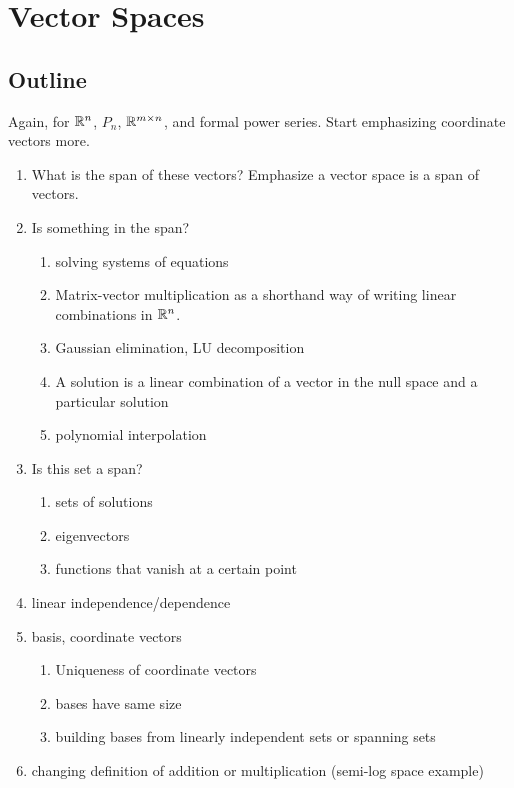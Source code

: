 \chapter{Vector Spaces}
\section{Outline}
Again, for $\mathbb{R}^n$, $P_n$, $\mathbb{R}^{m\times n}$, and formal power
series. Start emphasizing coordinate vectors more.
\begin{enumerate}
\item What is the span of these vectors?  Emphasize a vector space is
  a span of vectors.

\item Is something in the span?
  \begin{enumerate}
  \item solving systems of equations
  \item Matrix-vector multiplication as a shorthand way of writing
    linear combinations in $\mathbb{R}^n$.
  \item Gaussian elimination, LU decomposition
  \item A solution is a linear combination of a vector in the null
    space and a particular solution
  \item polynomial interpolation
  \end{enumerate}

\item Is this set a span?
  \begin{enumerate}
  \item sets of solutions
  \item eigenvectors
  \item functions that vanish at a certain point
  \end{enumerate}

\item linear independence/dependence

\item basis, coordinate vectors
  \begin{enumerate}
  \item Uniqueness of coordinate vectors
  \item bases have same size
  \item building bases from linearly independent sets or spanning sets
  \end{enumerate}

\item changing definition of addition or multiplication (semi-log
  space example)
\end{enumerate}

